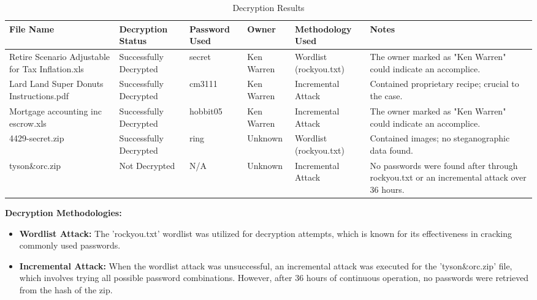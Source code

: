 \begin{table}[htbp]
\centering
\begin{tabular}{|p{3.8cm}|p{2cm}|p{1.5cm}|p{1.8cm}|p{2.5cm}|p{3cm}|}
\hline
\textbf{File Name} & \textbf{Decryption Status} & \textbf{Password Used} & \textbf{Owner} & \textbf{Methodology Used} & \textbf{Notes} \\
\hline
Retire Scenario Adjustable for Tax Inflation.xls & Successfully Decrypted & secret & Ken Warren & Wordlist (rockyou.txt) & The owner marked as "Ken Warren" could indicate an accomplice. \\
\hline
Lard Land Super Donuts Instructions.pdf & Successfully Decrypted & cm3111 & Ken Warren & Incremental Attack & Contained proprietary recipe; crucial to the case. \\
\hline
Mortgage accounting inc escrow.xls & Successfully Decrypted & hobbit05 & Ken Warren & Incremental Attack & The owner marked as "Ken Warren" could indicate an accomplice. \\
\hline
4429-secret.zip & Successfully Decrypted & ring & Unknown & Wordlist (rockyou.txt) & Contained images; no steganographic data found. \\
\hline
tyson\&orc.zip & Not Decrypted & N/A & Unknown & Incremental Attack & No passwords were found after through rockyou.txt or an incremental attack over 36 hours. \\
\hline
\end{tabular}
\caption{Decryption Results}
\label{table:decryption-results}
\end{table}

\textbf{Decryption Methodologies:}
\begin{itemize}
    \item \textbf{Wordlist Attack:} The 'rockyou.txt' wordlist was utilized for decryption attempts, which is known for its effectiveness in cracking commonly used passwords.
    \item \textbf{Incremental Attack:} When the wordlist attack was unsuccessful, an incremental attack was executed for the 'tyson\&orc.zip' file, which involves trying all possible password combinations. However, after 36 hours of continuous operation, no passwords were retrieved from the hash of the zip.
\end{itemize}

